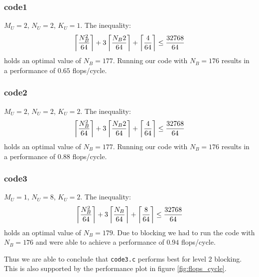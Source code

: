 \documentclass[portrait,a4paper]{article}
\begin{document}
\subsubsection{code1}
$M_U=2$, $N_U=2$, $K_U=1$. The inequality:
\begin{align*}
    \left\lceil {N_B^2 \over 64} \right\rceil + 3\left\lceil {N_B 2 \over 64} \right\rceil
    + \left\lceil {4 \over 64} \right\rceil \leq {32768 \over 64}
\end{align*}
holds an optimal value of $N_B=177$.  Running our code with $N_B=176$ results in a performance of $0.65$ flops/cycle.
\subsubsection{code2}
$M_U=2$, $N_U=2$, $K_U=2$. The inequality:
\begin{align*}
    \left\lceil {N_B^2 \over 64} \right\rceil + 3\left\lceil {N_B 2 \over 64} \right\rceil
    + \left\lceil {4\over 64} \right\rceil \leq {32768 \over 64}
\end{align*}
holds an optimal value of $N_B=177$. Running our code with $N_B=176$ results in a performance of $0.88$ flops/cycle.

\subsubsection{code3}
$M_U=1$, $N_U=8$, $K_U=2$. The inequality:
\begin{align*}
    \left\lceil {N_B^2 \over 64} \right\rceil + 3\left\lceil {N_B \over 64} \right\rceil
    + \left\lceil {8 \over 64} \right\rceil \leq {32768 \over 64}
\end{align*}
holds an optimal value of $N_B=179$. Due to blocking we had to run the code with $N_B=176$ and were able to achieve a performance of $0.94$ flops/cycle.

Thus we are able to conclude that \lstinline{code3.c} performs best for level 2 blocking. This is also supported by the performance plot in figure \ref{fig:flops_cycle}.
\end{document}
